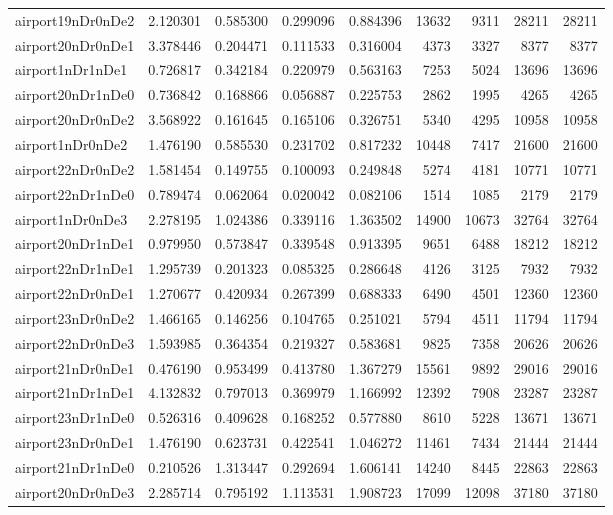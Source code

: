 \begin{longtable}{|l|r|r|r|r|r|r|r|r|}
airport19nDr0nDe2 & 2.120301 & 0.585300 & 0.299096 & 0.884396 & 13632 & 9311 & 28211 & 28211 \\
airport20nDr0nDe1 & 3.378446 & 0.204471 & 0.111533 & 0.316004 & 4373 & 3327 & 8377 & 8377 \\
airport1nDr1nDe1 & 0.726817 & 0.342184 & 0.220979 & 0.563163 & 7253 & 5024 & 13696 & 13696 \\
airport20nDr1nDe0 & 0.736842 & 0.168866 & 0.056887 & 0.225753 & 2862 & 1995 & 4265 & 4265 \\
airport20nDr0nDe2 & 3.568922 & 0.161645 & 0.165106 & 0.326751 & 5340 & 4295 & 10958 & 10958 \\
airport1nDr0nDe2 & 1.476190 & 0.585530 & 0.231702 & 0.817232 & 10448 & 7417 & 21600 & 21600 \\
airport22nDr0nDe2 & 1.581454 & 0.149755 & 0.100093 & 0.249848 & 5274 & 4181 & 10771 & 10771 \\
airport22nDr1nDe0 & 0.789474 & 0.062064 & 0.020042 & 0.082106 & 1514 & 1085 & 2179 & 2179 \\
airport1nDr0nDe3 & 2.278195 & 1.024386 & 0.339116 & 1.363502 & 14900 & 10673 & 32764 & 32764 \\
airport20nDr1nDe1 & 0.979950 & 0.573847 & 0.339548 & 0.913395 & 9651 & 6488 & 18212 & 18212 \\
airport22nDr1nDe1 & 1.295739 & 0.201323 & 0.085325 & 0.286648 & 4126 & 3125 & 7932 & 7932 \\
airport22nDr0nDe1 & 1.270677 & 0.420934 & 0.267399 & 0.688333 & 6490 & 4501 & 12360 & 12360 \\
airport23nDr0nDe2 & 1.466165 & 0.146256 & 0.104765 & 0.251021 & 5794 & 4511 & 11794 & 11794 \\
airport22nDr0nDe3 & 1.593985 & 0.364354 & 0.219327 & 0.583681 & 9825 & 7358 & 20626 & 20626 \\
airport21nDr0nDe1 & 0.476190 & 0.953499 & 0.413780 & 1.367279 & 15561 & 9892 & 29016 & 29016 \\
airport21nDr1nDe1 & 4.132832 & 0.797013 & 0.369979 & 1.166992 & 12392 & 7908 & 23287 & 23287 \\
airport23nDr1nDe0 & 0.526316 & 0.409628 & 0.168252 & 0.577880 & 8610 & 5228 & 13671 & 13671 \\
airport23nDr0nDe1 & 1.476190 & 0.623731 & 0.422541 & 1.046272 & 11461 & 7434 & 21444 & 21444 \\
airport21nDr1nDe0 & 0.210526 & 1.313447 & 0.292694 & 1.606141 & 14240 & 8445 & 22863 & 22863 \\
airport20nDr0nDe3 & 2.285714 & 0.795192 & 1.113531 & 1.908723 & 17099 & 12098 & 37180 & 37180 \\

\end{longtable}

